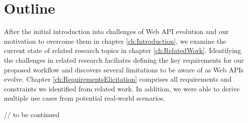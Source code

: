 \section{Outline}
\label{sec:Outline}

After the initial introduction into challenges of Web API evolution and our motivation to overcome them in chapter \ref{ch:Introduction}, we examine the current state of related research topics in chapter \ref{ch:RelatedWork}. Identifying the challenges in related research faciliates defining the key requirements for our proposed workflow and discovers several limitations to be aware of as Web APIs evolve. Chapter \ref{ch:RequirementsElicitation} comprises all requirements and constraints we identified from related work. In addition, we were able to derive multiple use cases from potential real-world scenarios.

// to be continued